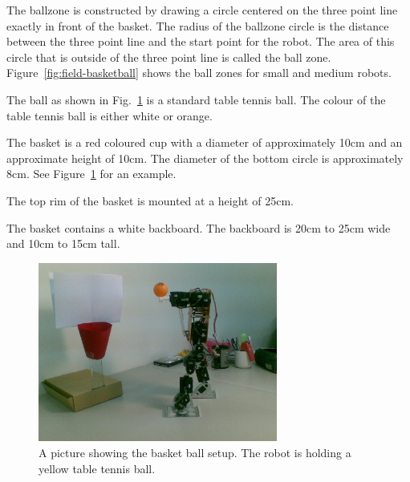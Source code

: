 \documentclass[12pt]{hurocup}
\begin{document}
\begin{lawlist}[BB]
\item The ballzone is constructed by drawing a circle centered on the
  three point line exactly in front of the basket. The radius of the
  ballzone circle is the distance between the three point line and the
  start point for the robot. The area of this circle that is outside
  of the three point line is called the ball
  zone. Figure~\ref{fig:field-basketball} shows the ball zones for
  small and medium robots.

\end{lawlist}


\begin{lawlist}[BB]

  \item The ball as shown in Fig.~\ref{fig:basketball-basket} is a
  standard table tennis ball. The colour of the table tennis ball is
  either white or orange.

  \item The basket is a red coloured cup with a diameter of
  approximately 10cm and an approximate height of 10cm. The diameter
  of the bottom circle is approximately 8cm. See
  Figure~\ref{fig:basketball-basket} for an example.

  \item The top rim of the basket is mounted at a height of 25cm.

  \item The basket contains a white backboard. The backboard is 20cm
  to 25cm wide and 10cm to 15cm tall.

 \begin{figure}
    \begin{center}
      \includegraphics[width=0.7\textwidth]{Figures/basketball-basket}
    \end{center}
    \caption{A picture showing the basket ball setup. The robot is
             holding a yellow table tennis ball.}
    \label{fig:basketball-basket}
  \end{figure}


\end{lawlist}
\end{document}

